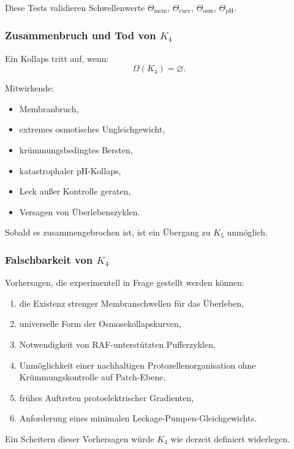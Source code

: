 Diese Tests validieren Schwellenwerte $\Theta_{\mathrm{mem}}$,
$\Theta_{\mathrm{curv}}$, $\Theta_{\mathrm{osm}}$,
$\Theta_{\mathrm{pH}}$.

\subsubsection{Zusammenbruch und Tod von \texorpdfstring{$K_4$}{K_4}}

Ein Kollaps tritt auf, wenn:
\[
\Omega(K_4) = \varnothing.
\]

Mitwirkende:
\begin{itemize}
    \item Membranbruch,
    \item extremes osmotisches Ungleichgewicht,
    \item krümmungsbedingtes Bersten,
    \item katastrophaler pH-Kollaps,
    \item Leck außer Kontrolle geraten,
    \item Versagen von Überlebenszyklen.
\end{itemize}

Sobald es zusammengebrochen ist, ist ein Übergang zu $K_5$ unmöglich.

\subsubsection{Falschbarkeit von \texorpdfstring{$K_4$}{K_4}}

Vorhersagen, die experimentell in Frage gestellt werden können:
\begin{enumerate}
    \item die Existenz strenger Membranschwellen für das Überleben,
    \item universelle Form der Osmosekollapskurven,
    \item Notwendigkeit von RAF-unterstützten Pufferzyklen,
    \item Unmöglichkeit einer nachhaltigen Protozellenorganisation ohne
          Krümmungskontrolle auf Patch-Ebene,
    \item frühes Auftreten protoelektrischer Gradienten,
    \item Anforderung eines minimalen Leckage-Pumpen-Gleichgewichts.
\end{enumerate}

Ein Scheitern dieser Vorhersagen würde $K_4$ wie derzeit definiert widerlegen.

